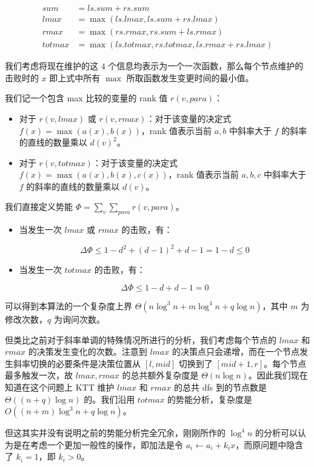\documentclass{noithesis}
\begin{document}
\begin{align*}
sum &= ls.sum + rs.sum\\
lmax &= \max(ls.lmax, ls.sum+rs.lmax)\\
rmax &= \max(rs.rmax, rs.sum+ls.rmax)\\
totmax &= \max(ls.totmax, rs.totmax, ls.rmax + rs.lmax)
\end{align*}

我们考虑将现在维护的这 $4$ 个信息均表示为一个一次函数，那么每个节点维护的击败时的 $x$ 即上式中所有 $\max$ 所取函数发生变更时间的最小值。

我们记一个包含 max 比较的变量的 rank 值 $r(v, para)$：

\begin{itemize}
\item 对于 $r(v, lmax)$ 或 $r(v, rmax)$：对于该变量的决定式 $f(x) = \max(a(x), b(x))$，rank 值表示当前 $a, b$ 中斜率大于 $f$ 的斜率的直线的数量乘以 $d(v)^2$。
\item 对于 $r(v, totmax)$：对于该变量的决定式 $f(x) = \max(a(x), b(x), c(x))$，rank 值表示当前 $a, b, c$ 中斜率大于 $f$ 的斜率的直线的数量乘以 $d(v)$。
\end{itemize}

我们直接定义势能 $\Phi = \sum_v \sum_{para} r(v, para)$。

\begin{itemize}
\item 当发生一次 $lmax$ 或 $rmax$ 的击败，有：

$$ \Delta \Phi \le 1 -d^2 + (d-1)^2 + d-1 = 1-d \le 0 $$

\item 当发生一次 $totmax$ 的击败，有：
  
  $$ \Delta \Phi \le 1 -d + d-1 = 0 $$

\end{itemize}

可以得到本算法的一个复杂度上界 $\Theta(n\log^3 n + m\log^4 n + q\log n)$，其中 $m$ 为修改次数，$q$ 为询问次数。

但类比之前对于斜率单调的特殊情况所进行的分析，我们考虑每个节点的 $lmax$ 和 $rmax$ 的决策发生变化的次数。注意到 $lmax$ 的决策点只会递增，而在一个节点发生斜率切换的必要条件是决策位置从 $[l, mid]$ 切换到了 $[mid+1, r]$。每个节点最多触发一次，故 $lmax, rmax$ 的总共额外复杂度是 $\Theta(n\log n)$。因此我们现在知道在这个问题上 KTT 维护 $lmax$ 和 $rmax$ 的总共 dfs 到的节点数是 $\Theta((n + q)\log n)$ 的。我们沿用 $totmax$ 的势能分析，复杂度是 $O((n+m)\log^3 n + q\log n)$。

但这其实并没有说明之前的势能分析完全冗余，刚刚所作的 $\log^4 n$ 的分析可以认为是在考虑一个更加一般性的操作，即加法是令 $a_i \leftarrow a_i + k_i x$，而原问题中隐含了 $k_i=1$，即 $k_i > 0$。
\end{document}
